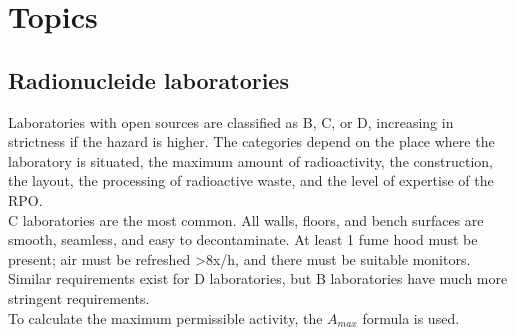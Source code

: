 \section{Topics}
\subsection{Radionucleide laboratories}
Laboratories with open sources are classified as B, C, or D, increasing in strictness if the hazard is higher. The categories depend on the place where the laboratory is situated, the maximum amount of radioactivity, the construction, the layout, the processing of radioactive waste, and the level of expertise of the RPO. \\
C laboratories are the most common. All walls, floors, and bench surfaces are smooth, seamless, and easy to decontaminate. At least 1 fume hood must be present; air must be refreshed >8x/h, and there must be suitable monitors. Similar requirements exist for D laboratories, but B laboratories have much more stringent requirements. \\
To calculate the maximum permissible activity, the $A_{max}$ formula is used.